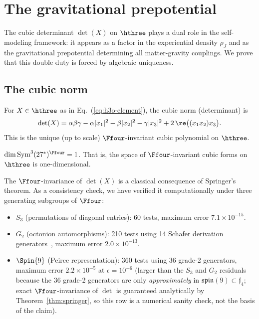 
\section{The gravitational prepotential}
\label{sec:prepotential}

The cubic determinant $\det(X)$ on $\hthree$ plays a dual role in the
self-modeling framework: it appears as a factor in the experiential
density $\rho_J$ and as the gravitational prepotential determining all
matter-gravity couplings. We prove that this double duty is forced by
algebraic uniqueness.

\subsection{The cubic norm}

For $X \in \hthree$ as in Eq.~(\ref{eq:h3o-element}), the cubic norm
(determinant) is
\begin{equation}
\label{eq:det3}
\det(X) = \alpha\beta\gamma
  - \alpha |x_1|^2 - \beta |x_2|^2 - \gamma |x_3|^2
  + 2\,\re\bigl((x_1 x_2) x_3\bigr).
\end{equation}
This is the unique (up to scale) $\Ffour$-invariant cubic polynomial
on $\hthree$.

\begin{theorem}
\label{thm:springer}
$\dim \mathrm{Sym}^3(27^*)^{\Ffour} = 1$.
That is, the space of $\Ffour$-invariant cubic forms on $\hthree$ is
one-dimensional.
\end{theorem}

The $\Ffour$-invariance of $\det(X)$ is a classical consequence of
Springer's theorem. As a consistency check, we have verified it
computationally under three generating subgroups of $\Ffour$:
\begin{itemize}
\item $S_3$ (permutations of diagonal entries): 60 tests, maximum
  error $7.1 \times 10^{-15}$.
\item $G_2$ (octonion automorphisms): 210 tests using 14 Schafer
  derivation generators~\cite{Schafer1966}, maximum error
  $2.0 \times 10^{-13}$.
\item $\Spin{9}$ (Peirce representation): 360 tests using 36 grade-2
  generators, maximum error $2.2 \times 10^{-5}$ at $\epsilon = 10^{-6}$
  (larger than the $S_3$ and $G_2$ residuals because the 36 grade-2
  generators are only \emph{approximately} in $\mathfrak{spin}(9)
  \subset\mathfrak{f}_4$; exact $\Ffour$-invariance of $\det$ is
  guaranteed analytically by Theorem~\ref{thm:springer}, so this row
  is a numerical sanity check, not the basis of the claim).
\end{itemize}


